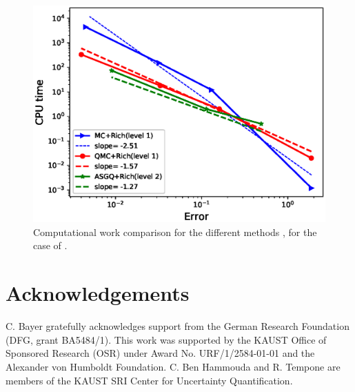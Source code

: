 \documentclass[ima, 20pt, portrait, plainboxedsections]{sciposter}
\begin{document}
\begin{multicols}{3}
\begin{figure}[h!]
	\centering
	\includegraphics[width=0.7\linewidth]{./rBergomi_Complexity_rates/set2/error_vs_time_set2_full_comparison}
	\caption{Computational work comparison for the different methods , for the case of .}	\label{fig:Complexity plot for  MISC for Case set $2$ parameters, comparison}
\end{figure}


\section*{Acknowledgements}
C. Bayer gratefully acknowledges support from the German Research Foundation (DFG, grant BA5484/1). This work was supported by the KAUST Office of Sponsored Research (OSR) under Award No. URF/1/2584-01-01 and the Alexander von Humboldt Foundation. C. Ben Hammouda and R. Tempone are members of the KAUST SRI Center for Uncertainty Quantification. 

\footnotesize



\end{multicols}
\end{document}
